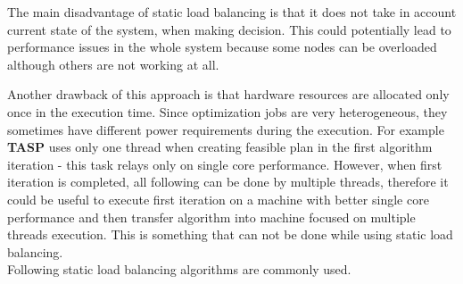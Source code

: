 The main disadvantage of static load balancing is that it does not take in account current state of the system,
when making decision.
This could potentially lead to performance issues in the whole system because some nodes can be overloaded although others are not working at all.

Another drawback of this approach is that hardware resources are allocated only once in the execution time.
Since optimization jobs are very heterogeneous, they sometimes have different power requirements during the execution.
For example \textbf{TASP} uses only one thread when creating feasible plan in the first algorithm iteration -
this task relays only on single core performance.
However, when first iteration is completed, all following can be done by multiple threads,
therefore it could be useful to execute first iteration on a machine with better single core performance
and then transfer algorithm into machine focused on multiple threads execution.
This is something that can not be done while using static load balancing.\\
Following static load balancing algorithms are commonly used.
